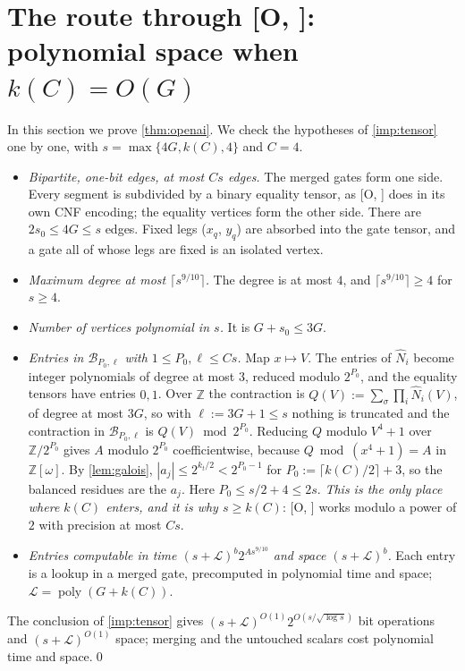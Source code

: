 \documentclass[10pt]{amsart}
\theoremstyle{plain}
\theoremstyle{definition}
\theoremstyle{remark}
\numberwithin{equation}{section}
\newcommand{\Z}{\mathbb{Z}}
\newcommand{\Zw}{\Z[\omega]}
\newcommand{\poly}{\operatorname{poly}}
\newcommand{\cB}{\mathcal{B}}
\newcommand{\cL}{\mathcal{L}}
\newcommand{\Oa}[1][]{\textup{[O\if\relax\detokenize{#1}\relax\else, #1\fi]}}
\begin{document}
\section{The route through \texorpdfstring{\Oa}{[O]}: polynomial space when \texorpdfstring{$k(C)=O(G)$}{k(C)=O(G)}}\label{sec:openai}

In this section we prove \cref{thm:openai}.
We check the hypotheses of \cref{imp:tensor} one by one, with $s=\max\{4G,k(C),4\}$ and $C=4$.

\begin{itemize}
\item \emph{Bipartite, one-bit edges, at most $Cs$ edges.} The merged gates form one side. Every
segment is subdivided by a binary equality tensor, as \Oa{} does in its own CNF encoding; the
equality vertices form the other side. There are $2s_0\le4G\le s$ edges. Fixed legs ($x_q$,
$y_q$) are absorbed into the gate tensor, and a gate all of whose legs are fixed is an isolated
vertex.
\item \emph{Maximum degree at most $\lceil s^{9/10}\rceil$.} The degree is at most $4$, and
$\lceil s^{9/10}\rceil\ge4$ for $s\ge4$.
\item \emph{Number of vertices polynomial in $s$.} It is $G+s_0\le3G$.
\item \emph{Entries in $\cB_{P_0,\ell}$ with $1\le P_0,\ell\le Cs$.} Map $x\mapsto V$. The entries
of $\hat N_i$ become integer polynomials of degree at most $3$, reduced modulo $2^{P_0}$, and the
equality tensors have entries $0,1$. Over $\Z$ the contraction is $Q(V):=\sum_\sigma\prod_i\hat N_i(V)$, of
degree at most $3G$, so with $\ell:=3G+1\le s$ nothing is truncated and the contraction in
$\cB_{P_0,\ell}$ is $Q(V)\bmod 2^{P_0}$. Reducing $Q$ modulo $V^4+1$ over $\Z/2^{P_0}$ gives $A$
modulo $2^{P_0}$ coefficientwise, because $Q\bmod(x^4+1)=A$ in $\Zw$. By \cref{lem:galois},
$|a_j|\le2^{k_t/2}<2^{P_0-1}$ for $P_0:=\lceil k(C)/2\rceil+3$, so the balanced residues are the
$a_j$. Here $P_0\le s/2+4\le2s$. \emph{This is the only place where $k(C)$ enters, and it is why
$s\ge k(C)$}: \Oa{} works modulo a power of $2$ with precision at most $Cs$.
\item \emph{Entries computable in time $(s+\cL)^b2^{As^{9/10}}$ and space $(s+\cL)^b$.} Each entry is
a lookup in a merged gate, precomputed in polynomial time and space; $\cL=\poly(G+k(C))$.
\end{itemize}
The conclusion of \cref{imp:tensor} gives $(s+\cL)^{O(1)}2^{O(s/\sqrt{\log s})}$ bit operations and
$(s+\cL)^{O(1)}$ space; merging and the untouched scalars cost polynomial time and space.\qed
\end{document}

